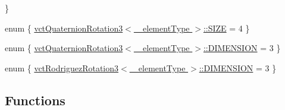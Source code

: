\begin{DoxyCompactItemize}
 \}
\item 
enum \{ \hyperlink{group__cisst_vector_ggaf79c9874c4f1376d8f3fa7b15f140ff3afdd3977ff1d88ceaba530cfcdcc661b7}{vct\+Quaternion\+Rotation3$<$ \+\_\+element\+Type $>$\+::\+S\+I\+Z\+E} = 4
 \}
\item 
enum \{ \hyperlink{group__cisst_vector_ggae952bd5b245e3d6f3740fa115776e90ea0793f2e11223485735287937bd52b876}{vct\+Quaternion\+Rotation3$<$ \+\_\+element\+Type $>$\+::\+D\+I\+M\+E\+N\+S\+I\+O\+N} = 3
 \}
\item 
enum \{ \hyperlink{group__cisst_vector_gga7a58a7aa413585bc569bcf1f22656ae3a8bdaaaae91a14fa58479067f59ed9145}{vct\+Rodriguez\+Rotation3$<$ \+\_\+element\+Type $>$\+::\+D\+I\+M\+E\+N\+S\+I\+O\+N} = 3
 \}
\end{DoxyCompactItemize}
\subsection*{Functions}
